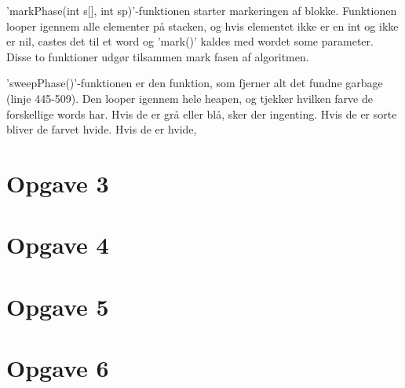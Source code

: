 'markPhase(int s[], int sp)'-funktionen starter markeringen af blokke. Funktionen looper igennem alle elementer på stacken, og hvis elementet ikke er en int og ikke er nil, castes det til et word og 'mark()' kaldes med wordet some parameter. Disse to funktioner udgør tilsammen mark fasen af algoritmen.

'sweepPhase()'-funktionen er den funktion, som fjerner alt det fundne garbage (linje 445-509). Den looper igennem hele heapen, og tjekker hvilken farve de forskellige words har. Hvis de er grå eller blå, sker der ingenting. Hvis de er sorte bliver de farvet hvide. Hvis de er hvide, %

\section{Opgave 3}
\label{O3}

\section{Opgave 4}
\label{O4}

\section{Opgave 5}
\label{O5}

\section{Opgave 6}
\label{O6}
